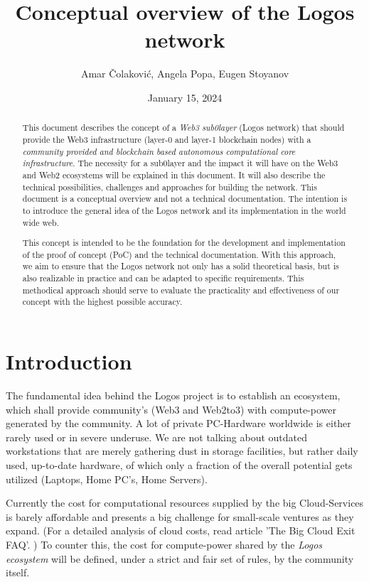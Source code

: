 \documentclass[]{article}
\title{Conceptual overview of the Logos network}
\author{Amar Čolaković, Angela Popa, Eugen Stoyanov}
\affil{LogosLabs}
\date{January 15, 2024}
\begin{document}
\maketitle

\begin{abstract}
This document describes the concept of a \textit{Web3 sub0layer} (Logos network) that should provide the Web3 infrastructure (layer-0 and layer-1 blockchain nodes) with a \textit{community provided and blockchain based autonomous computational core infrastructure}.
The necessity for a sub0layer and the impact it will have on the Web3 and Web2 ecosystems will be explained in this document. 
It will also describe the technical possibilities, challenges and approaches for building the network.   
This document is a conceptual overview and not a technical documentation. 
The intention is to introduce the general idea of the Logos network and its implementation in the world wide web.

This concept is intended to be the foundation for the development and implementation of the proof of concept (PoC) and the technical documentation. 
With this approach, we aim to ensure that the Logos network not only has a solid theoretical basis, but is also realizable in practice and can be adapted to specific requirements.
This methodical approach should serve to evaluate the practicality and effectiveness of our concept with the highest possible accuracy.    
\end{abstract}

\tableofcontents
\newpage

\section{Introduction}
The fundamental idea behind the Logos project is to establish an ecosystem, which shall provide community's (Web3 and Web2to3) with compute-power generated by the community.
A lot of private PC-Hardware worldwide is either rarely used or in severe underuse. 
We are not talking about outdated workstations that are merely gathering dust in storage facilities, but rather daily used, up-to-date hardware, of which only a fraction of the overall potential gets utilized (Laptops, Home PC’s, Home Servers).

Currently the cost for computational resources supplied by the big Cloud-Services is barely affordable and presents a big challenge for small-scale ventures as they expand. (For a detailed analysis of cloud costs, read article 'The Big Cloud Exit FAQ'. \cite{david-hainemeier-hansson})
To counter this, the cost for compute-power shared by the \textit{Logos ecosystem} will be defined, under a strict and fair set of rules, by the community itself.
\end{document}
